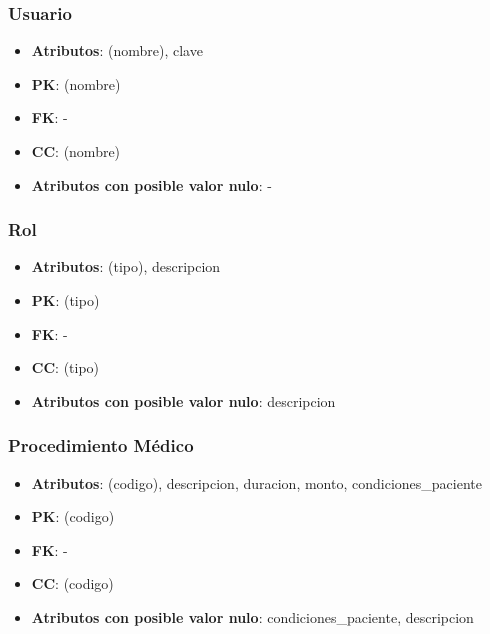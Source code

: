\documentclass[a4paper,11pt]{article}
\begin{document}
\subsubsection{\textbf{Usuario}}

\begin{itemize}

\item 
\textbf{Atributos}: (nombre), clave

\item 
\textbf{PK}: (nombre)

\item
\textbf{FK}: - 

\item 
\textbf{CC}: (nombre)

\item 
\textbf{Atributos con posible valor nulo}: -
\end{itemize}
\subsubsection{\textbf{Rol}}

\begin{itemize}

\item 
\textbf{Atributos}: (tipo), descripcion

\item 
\textbf{PK}: (tipo)

\item
\textbf{FK}: - 

\item 
\textbf{CC}: (tipo)

\item 
\textbf{Atributos con posible valor nulo}: descripcion

\end{itemize}

\subsubsection{\textbf{Procedimiento Médico}}

\begin{itemize}

\item 
\textbf{Atributos}: (codigo), descripcion, duracion, monto, condiciones\_paciente

\item 
\textbf{PK}: (codigo)

\item
\textbf{FK}: - 

\item 
\textbf{CC}: (codigo)

\item 
\textbf{Atributos con posible valor nulo}: condiciones\_paciente, descripcion

\end{itemize}
\end{document}
